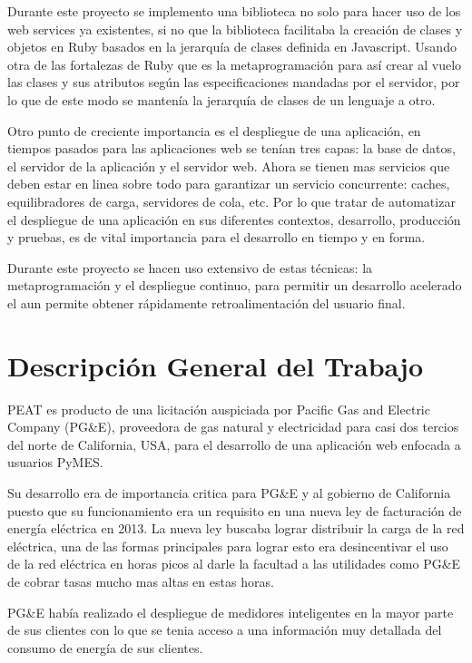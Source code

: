 \documentclass{article}
\begin{document}
Durante este proyecto se implemento una biblioteca no solo para hacer uso de
los web services ya existentes, si no que la biblioteca facilitaba la creación
de clases y objetos en Ruby basados en la jerarquía de clases definida
en Javascript. Usando otra de las fortalezas de Ruby que es la metaprogramación
para así crear al vuelo las clases y sus atributos según las especificaciones
mandadas por el servidor, por lo que de este modo se mantenía la jerarquía
de clases de un lenguaje a otro.

Otro punto de creciente importancia es el despliegue de una aplicación, en tiempos
pasados para las aplicaciones web se tenían tres capas: la base de datos,
el servidor de la aplicación y el servidor web. Ahora se tienen mas servicios
que deben estar en linea sobre todo para garantizar un servicio concurrente:
caches, equilibradores de carga, servidores de cola, etc. Por lo que tratar
de automatizar el despliegue de una aplicación en sus diferentes contextos,
desarrollo, producción y pruebas, es de vital importancia para el desarrollo
en tiempo y en forma.

Durante este proyecto se hacen uso extensivo de estas técnicas: la metaprogramación
y el despliegue continuo, para permitir un desarrollo acelerado el aun permite
obtener rápidamente retroalimentación del usuario final.

\section{Descripción General del Trabajo}
PEAT es producto de una licitación auspiciada por Pacific Gas and
Electric Company (PG\&E), proveedora de gas natural y electricidad
para casi dos tercios del norte de California, USA, para
el desarrollo de una aplicación web enfocada a usuarios PyMES.

Su desarrollo era de importancia critica para PG\&E y al gobierno de
California puesto que su funcionamiento era un requisito en una nueva
ley de facturación de energía eléctrica en 2013. La nueva ley buscaba
lograr distribuir la carga de la red eléctrica, una de las formas
principales para lograr esto era desincentivar el uso de la red
eléctrica en horas picos al darle la facultad a las utilidades como PG\&E
de cobrar tasas mucho mas altas en estas horas.

PG\&E había realizado el despliegue de medidores inteligentes en la
mayor parte de sus clientes con lo que se tenia acceso a una información
muy detallada del consumo de energía de sus clientes.
\end{document}
